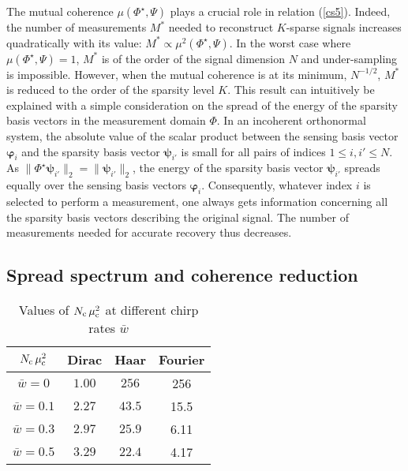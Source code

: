 \documentclass[10pt,draftcls, onecolumn]{IEEEtran}
\begin{document}
The mutual coherence $\mu\left(\mathsf{\Phi}^{\star},\mathsf{\Psi}\right)$ plays a crucial role in relation (\ref{cs5}). Indeed, the number of measurements $M^*$ needed to reconstruct $K$-sparse signals increases quadratically with its value: $M^*\propto\mu^{2}(\mathsf{\Phi}^{\star},\mathsf{\Psi})$. In the worst case where $\mu\left(\mathsf{\Phi}^{\star},\mathsf{\Psi}\right) = 1$, $M^*$ is of the order of the signal dimension $N$ and under-sampling is impossible. However, when the mutual coherence is at its minimum, $N^{-1/2}$, $M^*$ is reduced to the order of the sparsity level $K$. This result can intuitively be explained with a simple consideration on the spread of the energy of the sparsity basis vectors in the measurement domain $\mathsf{\Phi}$. In an incoherent orthonormal system, the absolute value of the scalar product between the sensing basis vector $\bm{\varphi}_{i}$ and the sparsity basis vector $\bm{\psi}_{i'}$ is small for all pairs of indices $1\leq i, i' \leq N$. As $\| \mathsf{\Phi}^{\star} \bm{\psi}_{i'} \|_2 = \| \bm{\psi}_{i'} \|_2$, the energy of the sparsity basis vector $\bm{\psi}_{i'}$ spreads equally over the sensing basis vectors $\bm{\varphi}_{i}$. Consequently, whatever index $i$ is selected to perform a measurement, one always gets information concerning all the sparsity basis vectors describing the original signal. The number of measurements needed for accurate recovery thus decreases.

\subsection{Spread spectrum and coherence reduction}
\label{sub:spread spectrum and coherence}

\begin{table}
\caption{\label{tab:table Nmu} Values of $N_{\rm c} \, \mu_{\rm c}^2$ at different chirp rates $\bar{w}$}
\centering
\renewcommand{\arraystretch}{1.05}
\begin{tabular}{c|ccc}
\hline 
$N_{\rm c} \, \mu_{\rm c}^2$ & Dirac & Haar & Fourier \\
\hline\hline
$\bar{w} = 0$ & $1.00$ & $256$ & 256 \\
$\bar{w} = 0.1$ & $2.27$ & $43.5$ & 15.5 \\
$\bar{w} = 0.3$ & $2.97$ & $25.9$ & 6.11 \\
$\bar{w} = 0.5$ & $3.29$ & $22.4$ & 4.17 \\
\hline
\end{tabular}
\end{table}
\end{document}
